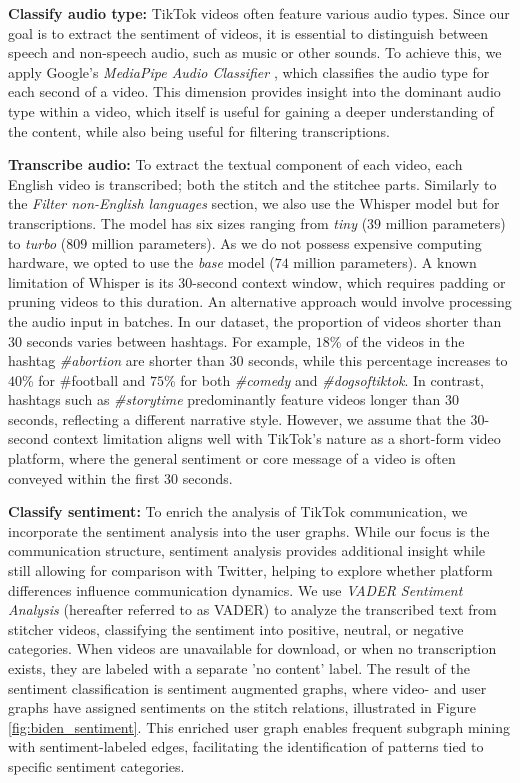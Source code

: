 \textbf{Classify audio type:}
TikTok videos often feature various audio types. Since our goal is to extract the sentiment of videos, it is essential to distinguish between speech and non-speech audio, such as music or other sounds. To achieve this, we apply Google's \textit{MediaPipe Audio Classifier} \citep{mediapipe_audio_classifier}, which classifies the audio type for each second of a video. This dimension provides insight into the dominant audio type within a video, which itself is useful for gaining a deeper understanding of the content, while also being useful for filtering transcriptions.

\textbf{Transcribe audio:}
To extract the textual component of each video, each English video is transcribed; both the stitch and the stitchee parts. Similarly to the \textit{Filter non-English languages} section, we also use the Whisper model but for transcriptions. The model has six sizes ranging from \textit{tiny} ($39$ million parameters) to \textit{turbo} ($809$ million parameters). As we do not possess expensive computing hardware, we opted to use the \textit{base} model ($74$ million parameters). A known limitation of Whisper is its $30$-second context window, which requires padding or pruning videos to this duration. An alternative approach would involve processing the audio input in batches. In our dataset, the proportion of videos shorter than $30$ seconds varies between hashtags. For example, $18$\% of the videos in the hashtag \textit{\#abortion} are shorter than $30$ seconds, while this percentage increases to $40$\% for \#football and $75$\% for both \textit{\#comedy} and \textit{\#dogsoftiktok}. In contrast, hashtags such as \textit{\#storytime} predominantly feature videos longer than $30$ seconds, reflecting a different narrative style. However, we assume that the $30$-second context limitation aligns well with TikTok's nature as a short-form video platform, where the general sentiment or core message of a video is often conveyed within the first $30$ seconds.

\textbf{Classify sentiment:}
To enrich the analysis of TikTok communication, we incorporate the sentiment analysis into the user graphs. While our focus is the communication structure, sentiment analysis provides additional insight while still allowing for comparison with Twitter, helping to explore whether platform differences influence communication dynamics. We use \textit{VADER Sentiment Analysis} (hereafter referred to as VADER) \citep{VADER} to analyze the transcribed text from stitcher videos, classifying the sentiment into positive, neutral, or negative categories. When videos are unavailable for download, or when no transcription exists, they are labeled with a separate 'no content' label. The result of the sentiment classification is sentiment augmented graphs, where video- and user graphs have assigned sentiments on the stitch relations, illustrated in Figure \ref{fig:biden_sentiment}. This enriched user graph enables frequent subgraph mining with sentiment-labeled edges, facilitating the identification of patterns tied to specific sentiment categories.


